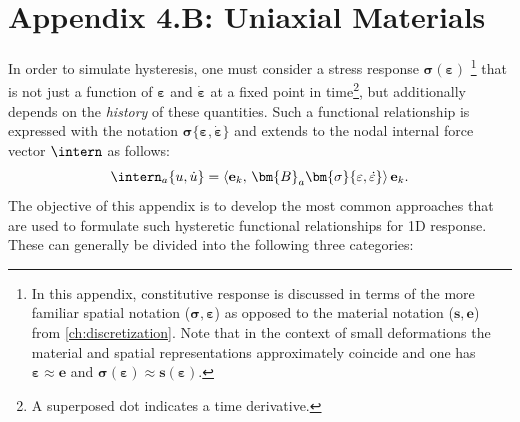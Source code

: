 
% 

\section{Appendix 4.B: Uniaxial Materials}\label{ch:inelasticity}
In order to simulate hysteresis, one must consider a stress response $\boldsymbol{\sigma}(\boldsymbol{\varepsilon})$ %
\footnote{
In this appendix, constitutive response is discussed in terms of 
the more familiar spatial notation (\(\boldsymbol{\sigma}, \boldsymbol{\varepsilon}\)) as opposed to the material notation (\(\boldsymbol{s}, \boldsymbol{e}\)) from \cref{ch:discretization}.
Note that in the context of small deformations the material and  spatial representations approximately coincide and one has $\boldsymbol{\varepsilon} \approx \boldsymbol{e}$ and $\boldsymbol{\sigma}(\boldsymbol{\varepsilon}) \approx \boldsymbol{s}(\boldsymbol{\varepsilon})$.}
that is not just a function of $\boldsymbol{\varepsilon}$ and $\dot{\boldsymbol{\varepsilon}}$ at a fixed point in time{\footnote{A superposed dot indicates a time derivative.}}, but additionally depends on the \emph{history} of these quantities. Such a functional relationship is expressed with the notation $\boldsymbol{\sigma}\{\boldsymbol{\varepsilon}, \dot{\boldsymbol{\varepsilon}}\}$ and extends to the nodal internal 
force vector $\intern$ %
as follows:
\begin{equation}
 \intern_a \{u, \dot{u}\} = \left<\mathbf{e}_k,\, \bm{B}_a \bm{\sigma} \{\varepsilon,\dot{\varepsilon}\}\right> \mathbf{e}_k.
 \label{eq:f_int_inelasticity}
\end{equation}
The objective of this appendix is to develop the most common
approaches that are used to formulate such hysteretic functional relationships for 1D response. These can generally be divided into the following three categories:
